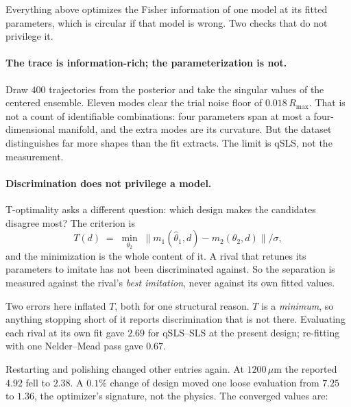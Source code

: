 \documentclass[10pt]{article}
\begin{document}
Everything above optimizes the Fisher information of one model at its fitted parameters,
which is circular if that model is wrong. Two checks that do not privilege it.

\paragraph{The trace is information-rich; the parameterization is not.}
Draw $400$ trajectories from the posterior and take the singular values of the centered
ensemble. Eleven modes clear the trial noise floor of $0.018\,R_{\max}$. That is not a count
of identifiable combinations: four parameters span at most a four-dimensional manifold, and
the extra modes are its curvature. But the dataset distinguishes far more shapes than the fit
extracts. The limit is qSLS, not the measurement.

\paragraph{Discrimination does not privilege a model.}
T-optimality \citep{atkinson1975design} asks a different question: which design makes the
candidates disagree most? The criterion is
%
\begin{equation}
T(d) \;=\; \min_{\theta_2} \; \bigl\lVert m_1(\hat\theta_1, d) - m_2(\theta_2, d) \bigr\rVert / \sigma ,
\label{eq:topt}
\end{equation}
%
and the minimization is the whole content of it. A rival that retunes its parameters to
imitate has not been discriminated against. So the separation is measured against the rival's
\emph{best imitation}, never against its own fitted values.

Two errors here inflated $T$, both for one structural reason. $T$ is a \emph{minimum}, so
anything stopping short of it reports discrimination that is not there. Evaluating each rival
at its own fit gave $2.69$ for qSLS--SLS at the present design; re-fitting with one
Nelder--Mead pass gave $0.67$.

Restarting and polishing changed other entries again. At $1200\,\mu$m the reported $4.92$
fell to $2.38$. A $0.1\%$ change of design moved one loose evaluation from $7.25$ to $1.36$, the optimizer's signature, not the physics. The converged values are:
\end{document}
